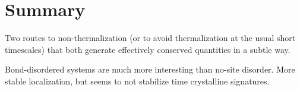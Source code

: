 \chapter*{Summary}
\label{pt:summary}
Two routes to non-thermalization (or to avoid thermalization at the usual short timescales) that both generate effectively conserved quantities in a subtle way.

Bond-disordered systems are much more interesting than no-site disorder. More stable localization, but seems to not stabilize time crystalline signatures.

